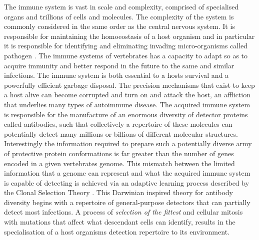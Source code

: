 The immune system is vast in scale and complexity, comprised of specialised organs and trillions of cells and molecules. The complexity of the system is commonly considered in the same order as the central nervous system. It is responsible for maintaining the homoeostasis of a host organism and in particular it is responsible for identifying and eliminating invading micro-organisms called pathogen \cite{Cohen2001a, Paul1991}. The immune systems of vertebrates has a capacity to adapt so as to acquire immunity and better respond in the future to the same and similar infections. The immune system is both essential to a hosts survival and a powerfully efficient garbage disposal. The precision mechanisms that exist to keep a host alive can become corrupted and turn on and attack the host, an affliction that underlies many types of autoimmune disease. The acquired immune system is responsible for the manufacture of an enormous diversity of detector proteins called antibodies, such that collectively a repertoire of these molecules can potentially detect many millions or billions of different molecular structures. Interestingly the information required to prepare such a potentially diverse army of protective protein conformations is far greater than the number of genes encoded in a given vertebrates genome. This mismatch between the limited information that a genome can represent and what the acquired immune system is capable of detecting is achieved via an adaptive learning process described by the Clonal Selection Theory \cite{Burnet1957}. This Darwinian inspired theory for antibody diversity begins with a repertoire of general-purpose detectors that can partially detect most infections. A process of \emph{selection of the fittest} and cellular mitosis with mutations that affect what descendant cells can identify, results in the specialisation of a host organisms detection repertoire to its environment.

